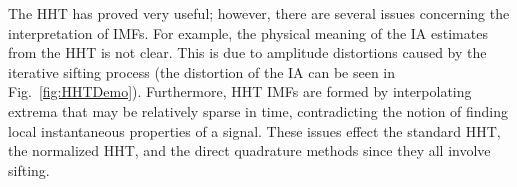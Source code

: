 \documentclass[a4paper]{IEEEtran}
\begin{document}
The HHT has proved very useful; however, there are several issues concerning the interpretation of IMFs. For example, the physical meaning of the IA estimates from the HHT is not clear. This is due to amplitude distortions caused by the iterative sifting process (the distortion of the IA can be seen in Fig.~\ref{fig:HHTDemo}). Furthermore, HHT IMFs are formed by interpolating extrema that may be relatively sparse in time, contradicting the notion of finding local instantaneous properties of a signal. These issues effect the standard HHT, the normalized HHT, and the direct quadrature methods since they all involve sifting. 
% 
\end{document}
